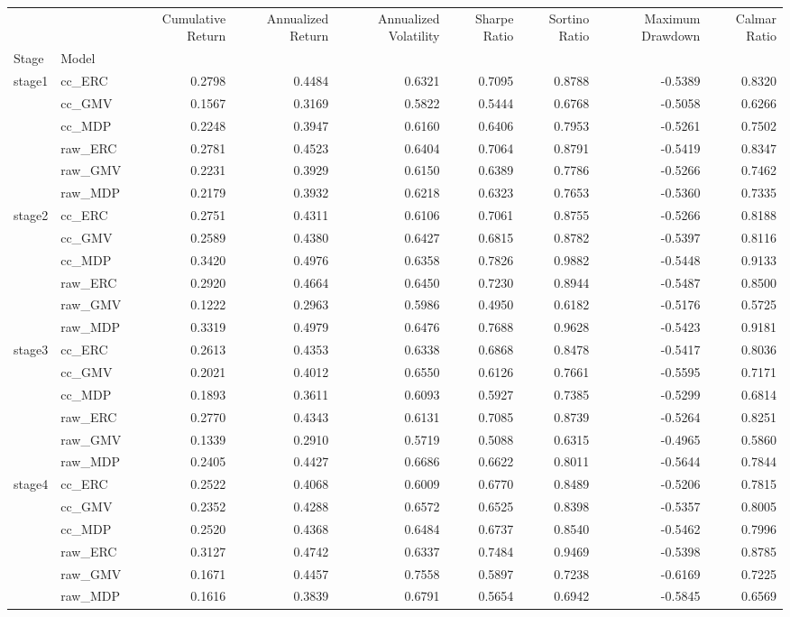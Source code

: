 \begin{tabular}{llrrrrrrr}
\toprule
 &  & Cumulative Return & Annualized Return & Annualized Volatility & Sharpe Ratio & Sortino Ratio & Maximum Drawdown & Calmar Ratio \\
Stage & Model &  &  &  &  &  &  &  \\
\midrule
\multirow[t]{6}{*}{stage1} & cc_ERC & 0.2798 & 0.4484 & 0.6321 & 0.7095 & 0.8788 & -0.5389 & 0.8320 \\
 & cc_GMV & 0.1567 & 0.3169 & 0.5822 & 0.5444 & 0.6768 & -0.5058 & 0.6266 \\
 & cc_MDP & 0.2248 & 0.3947 & 0.6160 & 0.6406 & 0.7953 & -0.5261 & 0.7502 \\
 & raw_ERC & 0.2781 & 0.4523 & 0.6404 & 0.7064 & 0.8791 & -0.5419 & 0.8347 \\
 & raw_GMV & 0.2231 & 0.3929 & 0.6150 & 0.6389 & 0.7786 & -0.5266 & 0.7462 \\
 & raw_MDP & 0.2179 & 0.3932 & 0.6218 & 0.6323 & 0.7653 & -0.5360 & 0.7335 \\
\cline{1-9}
\multirow[t]{6}{*}{stage2} & cc_ERC & 0.2751 & 0.4311 & 0.6106 & 0.7061 & 0.8755 & -0.5266 & 0.8188 \\
 & cc_GMV & 0.2589 & 0.4380 & 0.6427 & 0.6815 & 0.8782 & -0.5397 & 0.8116 \\
 & cc_MDP & 0.3420 & 0.4976 & 0.6358 & 0.7826 & 0.9882 & -0.5448 & 0.9133 \\
 & raw_ERC & 0.2920 & 0.4664 & 0.6450 & 0.7230 & 0.8944 & -0.5487 & 0.8500 \\
 & raw_GMV & 0.1222 & 0.2963 & 0.5986 & 0.4950 & 0.6182 & -0.5176 & 0.5725 \\
 & raw_MDP & 0.3319 & 0.4979 & 0.6476 & 0.7688 & 0.9628 & -0.5423 & 0.9181 \\
\cline{1-9}
\multirow[t]{6}{*}{stage3} & cc_ERC & 0.2613 & 0.4353 & 0.6338 & 0.6868 & 0.8478 & -0.5417 & 0.8036 \\
 & cc_GMV & 0.2021 & 0.4012 & 0.6550 & 0.6126 & 0.7661 & -0.5595 & 0.7171 \\
 & cc_MDP & 0.1893 & 0.3611 & 0.6093 & 0.5927 & 0.7385 & -0.5299 & 0.6814 \\
 & raw_ERC & 0.2770 & 0.4343 & 0.6131 & 0.7085 & 0.8739 & -0.5264 & 0.8251 \\
 & raw_GMV & 0.1339 & 0.2910 & 0.5719 & 0.5088 & 0.6315 & -0.4965 & 0.5860 \\
 & raw_MDP & 0.2405 & 0.4427 & 0.6686 & 0.6622 & 0.8011 & -0.5644 & 0.7844 \\
\cline{1-9}
\multirow[t]{6}{*}{stage4} & cc_ERC & 0.2522 & 0.4068 & 0.6009 & 0.6770 & 0.8489 & -0.5206 & 0.7815 \\
 & cc_GMV & 0.2352 & 0.4288 & 0.6572 & 0.6525 & 0.8398 & -0.5357 & 0.8005 \\
 & cc_MDP & 0.2520 & 0.4368 & 0.6484 & 0.6737 & 0.8540 & -0.5462 & 0.7996 \\
 & raw_ERC & 0.3127 & 0.4742 & 0.6337 & 0.7484 & 0.9469 & -0.5398 & 0.8785 \\
 & raw_GMV & 0.1671 & 0.4457 & 0.7558 & 0.5897 & 0.7238 & -0.6169 & 0.7225 \\
 & raw_MDP & 0.1616 & 0.3839 & 0.6791 & 0.5654 & 0.6942 & -0.5845 & 0.6569 \\
\cline{1-9}
\bottomrule
\end{tabular}
